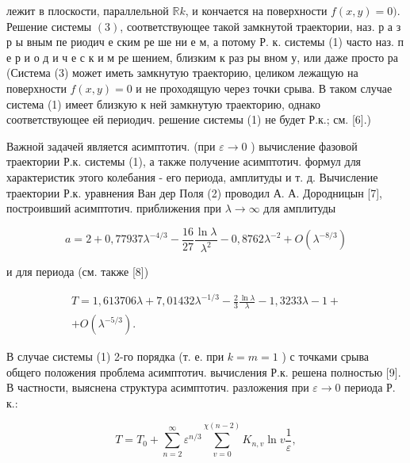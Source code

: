 \documentclass[10pt]{article}
\begin{document}
лежит в плоскости, параллельной $\mathbb{R} k$, и кончается на поверхности $f(x, y)=0)$. Решение системы $(3)$, соответствующее такой замкнутой траектории, наз. р а з р ы вным пе риодич е ским ре ше ни е м, а потому Р. к. системы (1) часто наз. п е р и о д и ч е с к и м ре шением, близким к раз ры вном у, или даже просто ра (Система (3) может иметь замкнутую траекторию, целиком лежащую на поверхности $f(x, y)=0$ и не проходящую через точки срыва. В таком случае система (1) имеет близкую к ней замкнутую траекторию, однако соответствующее ей периодич. решение системы (1) не будет Р.к.; см. [6].)



Важной задачей является асимптотич. (при $\varepsilon \rightarrow 0$ ) вычисление фазовой траектории Р.к. системы (1), а также получение асимптотич. формул для характеристик этого колебания - его периода, амплитуды и т. д. Вычисление траектории Р.к. уравнения Ван дер Поля (2) проводил А. А. Дородницын [7], построивший асимптотич. приближения при $\lambda \rightarrow \infty$ для амплитуды



\[

a=2+0,77937 \lambda^{-4 / 3}-\frac{16}{27} \frac{\ln \lambda}{\lambda^{2}}-0,8762 \lambda^{-2}+O\left(\lambda^{-8 / 3}\right)

\]



и для периода (см. также [8])



\[

\begin{gathered}

T=1,613706 \lambda+7,01432 \lambda^{-1 / 3}-\frac{2}{3} \frac{\ln \lambda}{\lambda}-1,3233 \lambda-1+ \\

+O\left(\lambda^{-5 / 3}\right) .

\end{gathered}

\]



В случае системы (1) 2-го порядка (т. е. при $k=m=1$ ) с точками срыва общего положения проблема асимптотич. вычисления Р.к. решена полностью [9]. В частности, выяснена структура асимптотич. разложения при $\varepsilon \rightarrow 0$ периода Р. к.:



\[

T=T_{0}+\sum_{n=2}^{\infty} \varepsilon^{n / 3} \sum_{v=0}^{\chi(n-2)} K_{n, v} \ln v \frac{1}{\varepsilon},

\]
\end{document}
